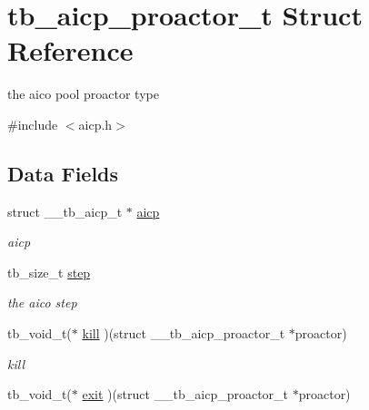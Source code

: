 \hypertarget{structtb__aicp__proactor__t}{\section{tb\-\_\-aicp\-\_\-proactor\-\_\-t Struct Reference}
\label{structtb__aicp__proactor__t}
}


the aico pool proactor type  




{\ttfamily \#include $<$aicp.\-h$>$}

\subsection*{Data Fields}
\begin{DoxyCompactItemize}
\item 
\hypertarget{structtb__aicp__proactor__t_a4619aaba10d6548416be935ad2ee39a9}{struct \-\_\-\-\_\-tb\-\_\-aicp\-\_\-t $\ast$ \hyperlink{structtb__aicp__proactor__t_a4619aaba10d6548416be935ad2ee39a9}{aicp}}\label{structtb__aicp__proactor__t_a4619aaba10d6548416be935ad2ee39a9}

\begin{DoxyCompactList}\small\item\em aicp \end{DoxyCompactList}\item 
\hypertarget{structtb__aicp__proactor__t_a401646c992f3801f03339f18f5388b4d}{tb\-\_\-size\-\_\-t \hyperlink{structtb__aicp__proactor__t_a401646c992f3801f03339f18f5388b4d}{step}}\label{structtb__aicp__proactor__t_a401646c992f3801f03339f18f5388b4d}

\begin{DoxyCompactList}\small\item\em the aico step \end{DoxyCompactList}\item 
\hypertarget{structtb__aicp__proactor__t_ae3becb7a2541aa1328e58184c3f94b55}{tb\-\_\-void\-\_\-t($\ast$ \hyperlink{structtb__aicp__proactor__t_ae3becb7a2541aa1328e58184c3f94b55}{kill} )(struct \-\_\-\-\_\-tb\-\_\-aicp\-\_\-proactor\-\_\-t $\ast$proactor)}\label{structtb__aicp__proactor__t_ae3becb7a2541aa1328e58184c3f94b55}

\begin{DoxyCompactList}\small\item\em kill \end{DoxyCompactList}\item 
\hypertarget{structtb__aicp__proactor__t_a7a664aa456ea3923f7c4fd2ec87b80ba}{tb\-\_\-void\-\_\-t($\ast$ \hyperlink{structtb__aicp__proactor__t_a7a664aa456ea3923f7c4fd2ec87b80ba}{exit} )(struct \-\_\-\-\_\-tb\-\_\-aicp\-\_\-proactor\-\_\-t $\ast$proactor)}\label{structtb__aicp__proactor__t_a7a664aa456ea3923f7c4fd2ec87b80ba}


\end{DoxyCompactItemize}
